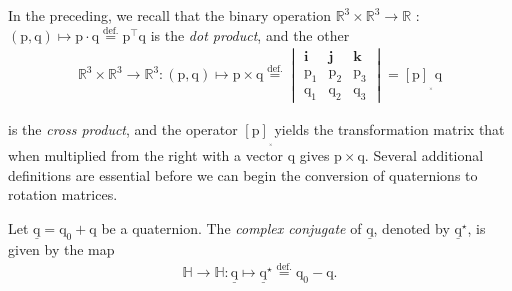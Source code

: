 \noindent In the preceding, we recall that the binary operation $\mathbb{R}^3\times\mathbb{R}^3\rightarrow\mathbb{R}$ : $(\bm{\mathrm{p}},\bm{\mathrm{q}})\mapsto\bm{\mathrm{p}}\cdot\bm{\mathrm{q}}\stackrel{\text{def.}}{=}\bm{\mathrm{p}}^\intercal\bm{\mathrm{q}}$ is the \textit{dot product}, and the other
\begin{align*}
	\mathbb{R}^3\times\mathbb{R}^3\rightarrow\mathbb{R}^3 : (\bm{\mathrm{p}},\bm{\mathrm{q}})\mapsto\bm{\mathrm{p}}\times\bm{\mathrm{q}}\stackrel{\text{def.}}{=}\begin{vmatrix} \bm{i} & \bm{j} & \bm{k} \\ \mathrm{p}_1 & \mathrm{p}_2 & \mathrm{p}_3 \\
		\mathrm{q}_1 & \mathrm{q}_2 & \mathrm{q}_3 \end{vmatrix}
		=[\bm{\mathrm{p}}]_{_{_\times}}\bm{\mathrm{q}}
\end{align*}

\noindent is the \textit{cross product}, and the operator $[\bm{\mathrm{p}}]_{_{_\times}}$yields the transformation matrix that when multiplied from the right with a vector $\bm{\mathrm{q}}$ gives $\bm{\mathrm{p}}\times\bm{\mathrm{q}}$.
\bigbreak 
Several additional definitions are essential before we can begin the conversion of quaternions to rotation matrices. 


\noindent Let $\underline{\bm{\mathrm{q}}}=\mathrm{q}_0 + \bm{\mathrm{q}}$ be a quaternion. The \textit{complex conjugate} of $\underline{\bm{\mathrm{q}}}$, denoted by $\underline{\bm{\mathrm{q}}}^\star$, is given by the map
\begin{align*}
	\mathbb{H}\rightarrow\mathbb{H}:\underline{\bm{\mathrm{q}}}\mapsto\underline{\bm{\mathrm{q}}}^\star\stackrel{\text{def.}}{=}\mathrm{q}_0 - \bm{\mathrm{q}}.
\end{align*} 

